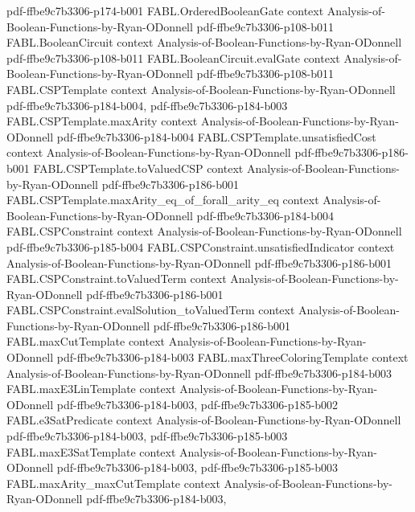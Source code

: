 \begin{theorem}
  {pdf-ffbe9c7b3306-p174-b001}
\proofstep
  {FABL.OrderedBooleanGate}
  {context}
  {Analysis-of-Boolean-Functions-by-Ryan-ODonnell}
  {pdf-ffbe9c7b3306-p108-b011}
\proofstep
  {FABL.BooleanCircuit}
  {context}
  {Analysis-of-Boolean-Functions-by-Ryan-ODonnell}
  {pdf-ffbe9c7b3306-p108-b011}
\proofstep
  {FABL.BooleanCircuit.evalGate}
  {context}
  {Analysis-of-Boolean-Functions-by-Ryan-ODonnell}
  {pdf-ffbe9c7b3306-p108-b011}
\proofstep
  {FABL.CSPTemplate}
  {context}
  {Analysis-of-Boolean-Functions-by-Ryan-ODonnell}
  {pdf-ffbe9c7b3306-p184-b004,
    pdf-ffbe9c7b3306-p184-b003}
\proofstep
  {FABL.CSPTemplate.maxArity}
  {context}
  {Analysis-of-Boolean-Functions-by-Ryan-ODonnell}
  {pdf-ffbe9c7b3306-p184-b004}
\proofstep
  {FABL.CSPTemplate.unsatisfiedCost}
  {context}
  {Analysis-of-Boolean-Functions-by-Ryan-ODonnell}
  {pdf-ffbe9c7b3306-p186-b001}
\proofstep
  {FABL.CSPTemplate.toValuedCSP}
  {context}
  {Analysis-of-Boolean-Functions-by-Ryan-ODonnell}
  {pdf-ffbe9c7b3306-p186-b001}
\proofstep
  {FABL.CSPTemplate.maxArity_eq_of_forall_arity_eq}
  {context}
  {Analysis-of-Boolean-Functions-by-Ryan-ODonnell}
  {pdf-ffbe9c7b3306-p184-b004}
\proofstep
  {FABL.CSPConstraint}
  {context}
  {Analysis-of-Boolean-Functions-by-Ryan-ODonnell}
  {pdf-ffbe9c7b3306-p185-b004}
\proofstep
  {FABL.CSPConstraint.unsatisfiedIndicator}
  {context}
  {Analysis-of-Boolean-Functions-by-Ryan-ODonnell}
  {pdf-ffbe9c7b3306-p186-b001}
\proofstep
  {FABL.CSPConstraint.toValuedTerm}
  {context}
  {Analysis-of-Boolean-Functions-by-Ryan-ODonnell}
  {pdf-ffbe9c7b3306-p186-b001}
\proofstep
  {FABL.CSPConstraint.evalSolution_toValuedTerm}
  {context}
  {Analysis-of-Boolean-Functions-by-Ryan-ODonnell}
  {pdf-ffbe9c7b3306-p186-b001}
\proofstep
  {FABL.maxCutTemplate}
  {context}
  {Analysis-of-Boolean-Functions-by-Ryan-ODonnell}
  {pdf-ffbe9c7b3306-p184-b003}
\proofstep
  {FABL.maxThreeColoringTemplate}
  {context}
  {Analysis-of-Boolean-Functions-by-Ryan-ODonnell}
  {pdf-ffbe9c7b3306-p184-b003}
\proofstep
  {FABL.maxE3LinTemplate}
  {context}
  {Analysis-of-Boolean-Functions-by-Ryan-ODonnell}
  {pdf-ffbe9c7b3306-p184-b003,
    pdf-ffbe9c7b3306-p185-b002}
\proofstep
  {FABL.e3SatPredicate}
  {context}
  {Analysis-of-Boolean-Functions-by-Ryan-ODonnell}
  {pdf-ffbe9c7b3306-p184-b003,
    pdf-ffbe9c7b3306-p185-b003}
\proofstep
  {FABL.maxE3SatTemplate}
  {context}
  {Analysis-of-Boolean-Functions-by-Ryan-ODonnell}
  {pdf-ffbe9c7b3306-p184-b003,
    pdf-ffbe9c7b3306-p185-b003}
\proofstep
  {FABL.maxArity_maxCutTemplate}
  {context}
  {Analysis-of-Boolean-Functions-by-Ryan-ODonnell}
  {pdf-ffbe9c7b3306-p184-b003,
}
\end{theorem}
